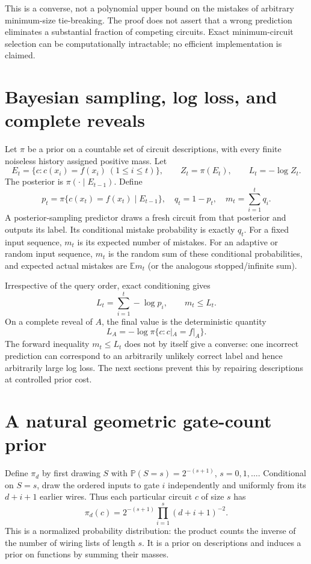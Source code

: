 \documentclass[11pt]{article}
\newcommand{\E}{\mathbb E}
\newcommand{\Prb}{\mathbb P}
\newcommand{\1}{\mathbf 1}
\begin{document}
This is a converse, not a polynomial upper bound on the mistakes of
arbitrary minimum-size tie-breaking. The proof does not assert that a
wrong prediction eliminates a substantial fraction of competing circuits.
Exact minimum-circuit selection can be computationally intractable; no
efficient implementation is claimed.

\section{Bayesian sampling, log loss, and complete reveals}

Let $\pi$ be a prior on a countable set of circuit descriptions, with every
finite noiseless history assigned positive mass. Let
\[
 E_t=\{c:c(x_i)=f(x_i)\ (1\le i\le t)\},\qquad
 Z_t=\pi(E_t),\qquad L_t=-\log Z_t.
\]
The posterior is $\pi(\cdot\mid E_{t-1})$. Define
\[
 p_t=\pi\{c(x_t)=f(x_t)\mid E_{t-1}\},\quad q_t=1-p_t,
 \quad m_t=\sum_{i=1}^t q_i.
\]
A posterior-sampling predictor draws a fresh circuit from that posterior
and outputs its label. Its conditional mistake probability is exactly
$q_t$. For a fixed input sequence, $m_t$ is its expected number of
mistakes. For an adaptive or random input sequence, $m_t$ is the random
sum of these conditional probabilities, and expected actual mistakes are
$\E m_t$ (or the analogous stopped/infinite sum).

Irrespective of the query order, exact conditioning gives
\begin{equation}\label{eq:logloss}
 L_t=\sum_{i=1}^t-\log p_i,\qquad m_t\le L_t.
\end{equation}
On a complete reveal of $A$, the final value is the deterministic quantity
\[
 L_A=-\log\pi\{c:c|_A=f|_A\}.
\]
The forward inequality $m_t\le L_t$ does not by itself give a converse:
one incorrect prediction can correspond to an arbitrarily unlikely
correct label and hence arbitrarily large log loss. The next sections
prevent this by repairing descriptions at controlled prior cost.

\section{A natural geometric gate-count prior}

Define $\pi_d$ by first drawing $S$ with
$\Prb(S=s)=2^{-(s+1)}$, $s=0,1,\ldots$. Conditional on $S=s$, draw the
ordered inputs to gate $i$ independently and uniformly from its
$d+i+1$ earlier wires. Thus each particular circuit $c$ of size $s$ has
\begin{equation}\label{eq:prior}
 \pi_d(c)=2^{-(s+1)}\prod_{i=1}^s(d+i+1)^{-2}.
\end{equation}
This is a normalized probability distribution: the product counts the
inverse of the number of wiring lists of length $s$. It is a prior on
descriptions and induces a prior on functions by summing their masses.
\end{document}
